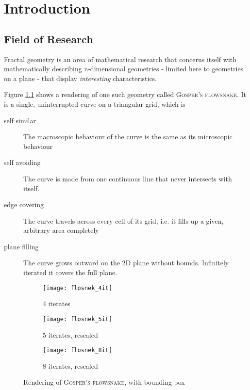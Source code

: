 \chapter{Introduction}
\label{cha:Intro}

\section{Field of Research}

Fractal geometry is an area of mathematical research that concerns itself with mathematically describing n-dimensional geometries - limited here to geometries on a plane - that display \textit{interesting} characteristics. 

Figure \ref{fig:flosnek} shows a rendering of one such geometry called \textsc{Gosper's flowsnake}.
It is a single, uninterrupted curve on a triangular grid, which is

\begin{description}
	\item [self similar] The macroscopic behaviour of the curve is the same as its microscopic behaviour
	\item [self avoiding] The curve is made from one continuous line that never intersects with itself.
	\item [edge covering] The curve travels across every cell of its grid, i.e. it fills up a given, arbitrary area completely
	\item [plane filling] The curve grows outward on the 2D plane without bounds. Infinitely iterated it covers the full plane.
\end{description}

\begin{figure}[h]
\centering
\begin{subfigure}{.33\textwidth}
  \centering
  \texttt{[image: flosnek\_4it]}
  \caption{4 iterates}
\end{subfigure}%
\begin{subfigure}{.33\textwidth}
  \centering
  \texttt{[image: flosnek\_5it]}
  \caption{5 iterates, rescaled}
\end{subfigure}%
\begin{subfigure}{.33\textwidth}
  \centering
  \texttt{[image: flosnek\_8it]}
  \caption{8 iterates, rescaled}
\end{subfigure}
\caption{Rendering of \textsc{Gosper's flowsnake}, with \gls{bounding box}}
	\label{fig:flosnek}
\end{figure}

